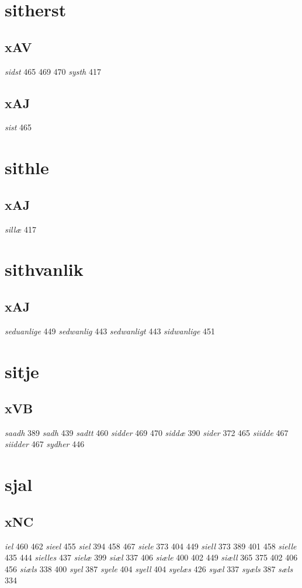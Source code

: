 \documentclass[a4paper,twocolumn]{article}
\begin{document}
\section{sitherst}
\label{sec:org31e7774}
\subsection{xAV}
\label{sec:org0648825}
\emph{sidst} 465 469 470 \emph{systh} 417 
\subsection{xAJ}
\label{sec:org3a2e6af}
\emph{sist} 465 
\section{sithle}
\label{sec:orgcc6bb01}
\subsection{xAJ}
\label{sec:orgce0bc61}
\emph{sillæ} 417 
\section{sithvanlik}
\label{sec:org76d834f}
\subsection{xAJ}
\label{sec:orgb127acd}
\emph{seduanlige} 449 \emph{sedwanlig} 443 \emph{sedwanligt} 443 \emph{sidwanlige} 451 
\section{sitje}
\label{sec:org8869fc0}
\subsection{xVB}
\label{sec:org216057a}
\emph{saadh} 389 \emph{sadh} 439 \emph{sadtt} 460 \emph{sidder} 469 470 \emph{siddæ} 390 \emph{sider} 372 465 \emph{siidde} 467 \emph{siidder} 467 \emph{sydher} 446 
\section{sjal}
\label{sec:org18c3485}
\subsection{xNC}
\label{sec:orgc156e0c}
\emph{iel} 460 462 \emph{sieel} 455 \emph{siel} 394 458 467 \emph{siele} 373 404 449 \emph{siell} 373 389 401 458 \emph{sielle} 435 444 \emph{sielles} 437 \emph{sielæ} 399 \emph{siæl} 337 406 \emph{siæle} 400 402 449 \emph{siæll} 365 375 402 406 456 \emph{siæls} 338 400 \emph{syel} 387 \emph{syele} 404 \emph{syell} 404 \emph{syelæs} 426 \emph{syæl} 337 \emph{syæls} 387 \emph{sæls} 334 
\end{document}
